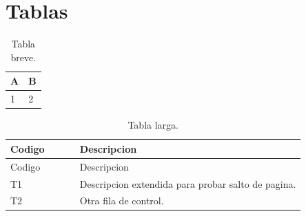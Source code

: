 \documentclass[11pt,a4paper,oneside]{report}
\begin{document}
\chapter{Tablas}
\begin{table}[htbp]
  \centering
  \caption{Tabla breve.}
  \begin{tabular}{ll}
    \toprule
    A & B \\
    \midrule
    1 & 2 \\
    \bottomrule
  \end{tabular}
\end{table}
\begin{longtable}{p{0.2\linewidth}p{0.65\linewidth}}
\caption{Tabla larga.}\\
\toprule
Codigo & Descripcion \\
\midrule
\endfirsthead
\toprule
Codigo & Descripcion \\
\midrule
\endhead
T1 & Descripcion extendida para probar salto de pagina. \\
T2 & Otra fila de control. \\
\bottomrule
\end{longtable}
\end{document}

